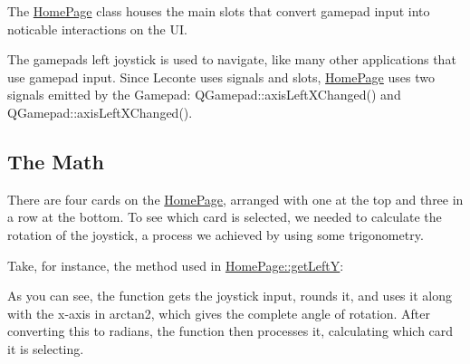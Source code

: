 The \mbox{\hyperlink{classHomePage}{Home\+Page}} class houses the main slots that convert gamepad input into noticable interactions on the UI.

The gamepad\textquotesingle{}s left joystick is used to navigate, like many other applications that use gamepad input. Since Leconte uses signals and slots, \mbox{\hyperlink{classHomePage}{Home\+Page}} uses two signals emitted by the Gamepad\+: {\ttfamily Q\+Gamepad\+::axis\+Left\+X\+Changed()} and {\ttfamily Q\+Gamepad\+::axis\+Left\+X\+Changed()}.

\subsection*{The Math}

There are four cards on the \mbox{\hyperlink{classHomePage}{Home\+Page}}, arranged with one at the top and three in a row at the bottom. To see which card is selected, we needed to calculate the rotation of the joystick, a process we achieved by using some trigonometry.

Take, for instance, the method used in {\ttfamily \mbox{\hyperlink{classHomePage_a38c909855e6b1e1a0739642949aa4f9a}{Home\+Page\+::get\+LeftY}}}\+: 
\begin{DoxyCode}{0}
\DoxyCodeLine{\textcolor{preprocessor}{\#include <cmath>}}
\DoxyCodeLine{\}}
\end{DoxyCode}


As you can see, the function gets the joystick input, rounds it, and uses it along with the x-\/axis in arctan2, which gives the complete angle of rotation. After converting this to radians, the function then processes it, calculating which card it is selecting.


